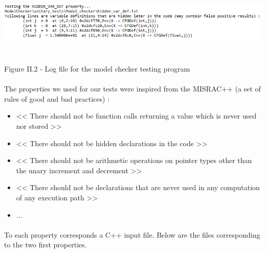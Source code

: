\documentclass{report}
\begin{document}
\begin{center}
\includegraphics[scale=0.8]{data/test-log2}
~\\~\\Figure II.2 - Log file for the model checker testing program
\end{center}

\paragraph{}
\hspace{4mm}The properties we used for our tests were inspired from the MISRAC++ (a set of rules of good and bad practices) :

\vspace{1.5mm}
\begin{itemize}
\item << There should not be function calls returning a value which is never used nor stored >>\vspace{1mm}
\item << There should not be hidden declarations in the code >>\vspace{1mm}
\item << There should not be arithmetic operations on pointer types other than the unary increment and decrement >>\vspace{1mm}
\item << There should not be declarations that are never used in any computation of any execution path >>\vspace{1mm}
\item ...\vspace{1mm}
\end{itemize}

\paragraph{}
\hspace{4mm}To each property corresponds a C++ input file. Below are the files corresponding to the two first properties.
\end{document}
